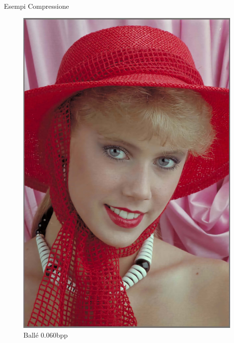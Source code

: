 \begin{frame}{Esempi Compressione}
\begin{figure}[!ht]
\begin{minipage}[]{0.13\linewidth}
                \includegraphics[width=\textwidth]{Immagini/IMAGES/mbt2018_2_IMG0004.pdf}
                \caption{Ballé 0.060bpp}
                \label{fig:ExampleBalle}
            \end{minipage}
            \begin{minipage}[]{0.13\linewidth}
                \centering

\end{minipage}
\end{figure}
\end{frame}
